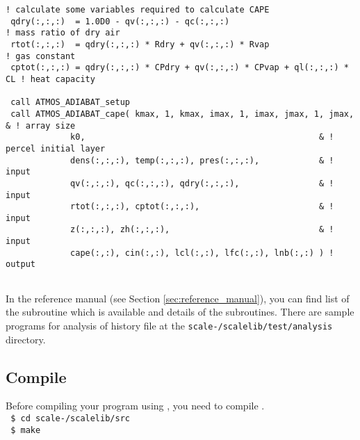 {  \verb|! calculate some variables required to calculate CAPE|\\
  \verb| qdry(:,:,:)  = 1.0D0 - qv(:,:,:) - qc(:,:,:)                            ! mass ratio of dry air|\\
  \verb| rtot(:,:,:)  = qdry(:,:,:) * Rdry + qv(:,:,:) * Rvap                    ! gas constant|\\
  \verb| cptot(:,:,:) = qdry(:,:,:) * CPdry + qv(:,:,:) * CPvap + ql(:,:,:) * CL ! heat capacity|\\
  \verb|                         |\\
  \verb| call ATMOS_ADIABAT_setup|\\
  \verb| call ATMOS_ADIABAT_cape( kmax, 1, kmax, imax, 1, imax, jmax, 1, jmax,      & ! array size|\\
  \hspace{12em}\verb|             k0,                                               & ! percel initial layer|\\
  \hspace{12em}\verb|             dens(:,:,:), temp(:,:,:), pres(:,:,:),            & ! input|\\
  \hspace{12em}\verb|             qv(:,:,:), qc(:,:,:), qdry(:,:,:),                & ! input|\\
  \hspace{12em}\verb|             rtot(:,:,:), cptot(:,:,:),                        & ! input|\\
  \hspace{12em}\verb|             z(:,:,:), zh(:,:,:),                              & ! input|\\
  \hspace{12em}\verb|             cape(:,:), cin(:,:), lcl(:,:), lfc(:,:), lnb(:,:) ) ! output|\\
  \verb| |\\
}


In the reference manual (see Section \ref{sec:reference_manual}), you can find list of the subroutine which is available and details of the subroutines.
There are sample programs for analysis of \scalerm history file at the \texttt{scale-\version/scalelib/test/analysis} directory.


\subsection{Compile}

Before compiling your program using \scalelib, you need to compile \scalelib.\\
\texttt{ \$ cd scale-\version/scalelib/src}\\
\texttt{ \$ make}

